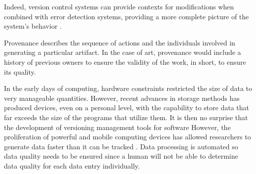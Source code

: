 Indeed, version control systems can provide contexts for modifications when combined with error detection systems, providing a more complete picture of the system's behavior \cite{Fischer2003}.

Provenance describes the sequence of actions and the individuals involved in generating a particular artifact.
In the case of art, provenance would include a history of previous owners to ensure the validity of the work, in short, to ensure its quality.

In the early days of computing, hardware constraints restricted the size of data to very manageable quantities.
However, recent advances in storage methods has produced devices, even on a personal level, with the capability to store data that far exceeds the size of the programs that utilize them.
It is then no surprise that the development of versioning management tools for software 
However, the proliferation of powerful and mobile computing devices has allowed researchers to generate data faster than it can be tracked \cite{Bose:2005:LRS:1057977.1057978}.
Data processing is automated so data quality needs to be ensured since a human will not be able to determine data quality for each data entry individually.

